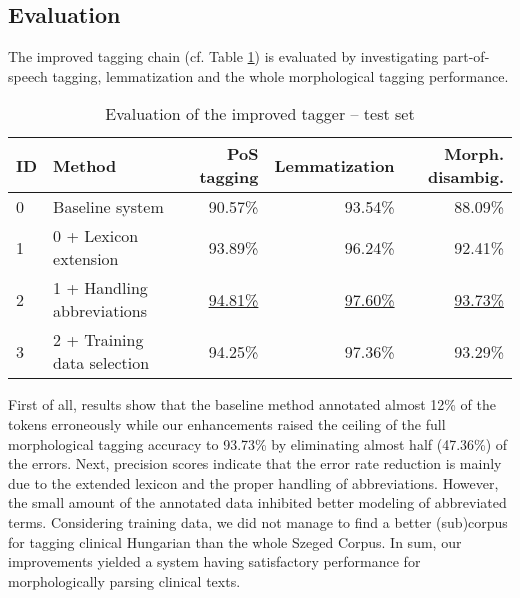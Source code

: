 \subsection{Evaluation}

The improved tagging chain (cf. Table \ref{tab:improvements}) is evaluated by investigating part-of-speech tagging, lemmatization and the whole morphological tagging performance.%

\begin{table}[h]
\centering
\caption{Evaluation of the improved tagger -- test set}
\label{tab:improvements}
\begin{tabular}{ l l r r r} 
\hline
ID & Method & PoS tagging & Lemmatization & Morph. disambig. \\
\hline
0 & Baseline system & 90.57\% & 93.54\% & 88.09\% \\
1 & 0 + Lexicon extension & 93.89\% & 96.24\% & 92.41\% \\
2 & 1 + Handling abbreviations & \underline{94.81\%} & \underline{97.60\%} & \underline{93.73\%} \\
3 & 2 + Training data selection & 94.25\% & 97.36\% & 93.29\% \\
\hline
\end{tabular}
\end{table}

First of all, results show that the baseline method annotated almost 12\% of the tokens erroneously while our enhancements raised the ceiling of the full morphological tagging accuracy to 93.73\% by eliminating almost half (47.36\%) of the errors. 
Next, precision scores indicate that the error rate reduction is mainly due to the extended lexicon and the proper handling of abbreviations. 
However, the small amount of the annotated data inhibited better modeling of abbreviated terms.
Considering training data, we did not manage to find a better (sub)corpus for tagging clinical Hungarian than the whole Szeged Corpus. %
In sum, our improvements yielded a system having satisfactory performance for morphologically parsing clinical texts.
